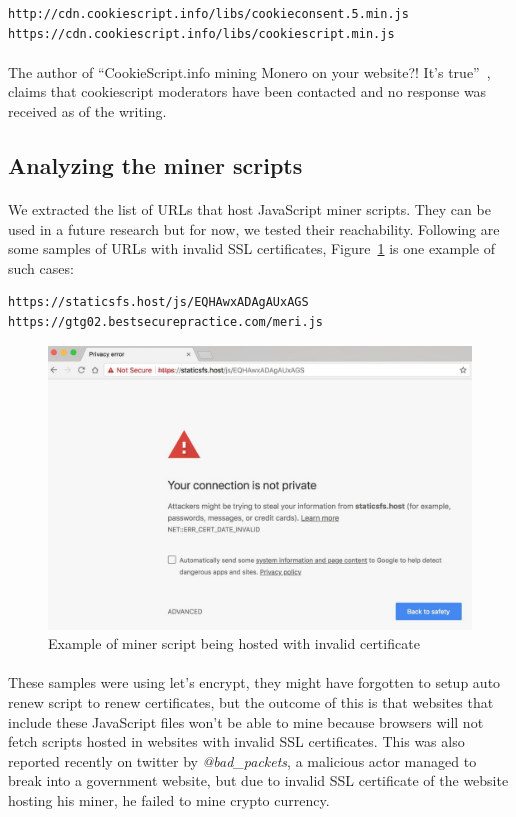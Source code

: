 \documentclass[letterpaper]{scrartcl} %
\numberwithin{equation}{section} %
\numberwithin{figure}{section} %
\numberwithin{table}{section} %
\begin{document}
\begin{lstlisting}
http://cdn.cookiescript.info/libs/cookieconsent.5.min.js
https://cdn.cookiescript.info/libs/cookiescript.min.js
\end{lstlisting}
\paragraph{}
The author of ``CookieScript.info mining Monero on your website?! It's true''~\cite{ref:cookiescript}, claims that cookiescript moderators have been contacted and no response was received as of the writing.

\subsection{Analyzing the miner scripts}
\paragraph{}
We extracted the list of URLs that host JavaScript miner scripts. They can be used in a future research but for now, we tested their reachability. Following are some samples of URLs with invalid SSL certificates, Figure~\ref{fig:miner-invalid-certificate} is one example of such cases:
\begin{lstlisting}
https://staticsfs.host/js/EQHAwxADAgAUxAGS
https://gtg02.bestsecurepractice.com/meri.js
\end{lstlisting}

\begin{figure}[t]
\centering
\includegraphics[width=0.8\columnwidth]{figures/miner-invalid-certificate.jpg}
\caption{Example of miner script being hosted with invalid certificate}
\label{fig:miner-invalid-certificate}
\end{figure}

\paragraph{}
These samples were using let's encrypt, they might have forgotten to setup auto renew script to renew certificates, but the outcome of this is that websites that include these JavaScript files won't be able to mine because browsers will not fetch scripts hosted in websites with invalid SSL certificates. This was also reported recently on twitter by \textit{@bad\_packets}, a malicious actor managed to break into a government website, but due to invalid SSL certificate of the website hosting his miner, he failed to mine crypto currency.
\end{document}
